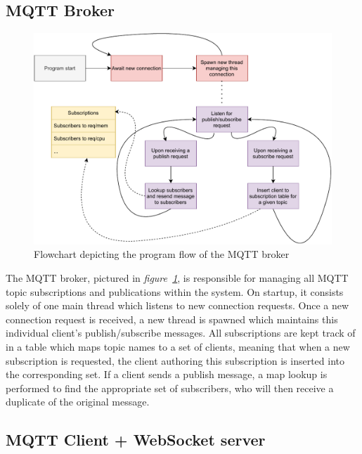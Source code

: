 \subsection{MQTT Broker}

\begin{figure}[H]
	\begin{center}
		\includegraphics[width=\textwidth]{./doc/mqtt_flowchart.pdf}
		\caption{Flowchart depicting the program flow of the MQTT broker}
		\label{mqtt-broker}
	\end{center}
\end{figure}

The MQTT broker, pictured in \textit{figure~\ref{mqtt-broker}}, is responsible for managing all MQTT topic subscriptions and publications within the system. On startup, it consists solely of one main thread which listens to new connection requests. Once a new connection request is received, a new thread is spawned which maintains this individual client's publish/subscribe messages. All subscriptions are kept track of in a table which maps topic names to a set of clients, meaning that when a new subscription is requested, the client authoring this subscription is inserted into the corresponding set. If a client sends a publish message, a map lookup is performed to find the appropriate set of subscribers, who will then receive a duplicate of the original message.

\subsection{MQTT Client + WebSocket server}

